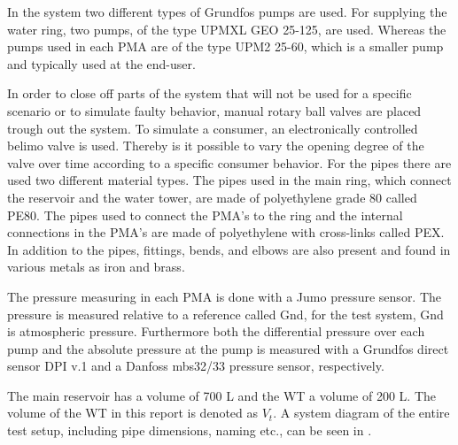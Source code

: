 In the system two different types of Grundfos pumps are used. For supplying the water ring, two pumps, of the type UPMXL GEO 25-125\cite{waterpump1}, are used. Whereas the pumps used in each PMA are of the type UPM2 25-60\cite{waterpump2}, which is a smaller pump and typically used at the end-user. 

In order to close off parts of the system that will not be used for a specific scenario or to simulate faulty behavior, manual rotary ball valves are placed trough out the system. 
To simulate a consumer, an electronically controlled belimo valve is used. Thereby is it possible to vary the opening degree of the valve over time according to a specific consumer behavior. 
For the pipes there are used two different material types. The pipes used in the main ring, which connect the reservoir and the water tower, are made of polyethylene grade 80 called PE80\cite{PE100}.
 The pipes used to connect the PMA's to the ring and the internal connections in the PMA's are made of polyethylene with cross-links called PEX. In addition to the pipes, fittings, bends, and elbows are also present and found in various metals as iron and brass.     

The pressure measuring in each PMA is done with a Jumo pressure sensor. The pressure is measured relative to a reference called Gnd, for the test system, Gnd is atmospheric pressure. Furthermore both the differential pressure over each pump and the absolute pressure at the pump is measured with a Grundfos direct sensor DPI v.1 and a Danfoss mbs32/33 pressure sensor, respectively.    

The main reservoir has a volume of 700 L and the WT a volume of 200 L. The volume of the WT in this report is denoted as $V_t$. A system diagram of the entire test setup, including pipe dimensions, naming etc., can be seen in .
